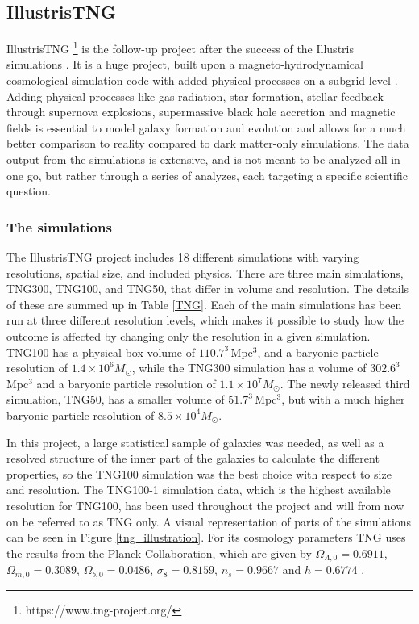 \subsection{IllustrisTNG}
IllustrisTNG \footnote{https://www.tng-project.org/} is the follow-up project after the success of the Illustris simulations \parencite{Springel2017, Pillepich2017,Naiman2018, Nelson2017, Marinacci2018}. It is a huge project, built upon a magneto-hydrodynamical cosmological simulation code with added physical processes on a subgrid level \parencite{Weinberger2016}. Adding physical processes like gas radiation, star formation, stellar feedback through supernova explosions, supermassive black hole accretion and magnetic fields is essential to model galaxy formation and evolution and allows for a much better comparison to reality compared to dark matter-only simulations. The data output from the simulations is extensive, and is not meant to be analyzed all in one go, but rather through a series of analyzes, each targeting a specific scientific question. 


\subsubsection{The simulations}
The IllustrisTNG project includes 18 different simulations with varying resolutions, spatial size, and included physics. There are three main simulations, TNG300, TNG100, and TNG50, that differ in volume and resolution. The details of these are summed up in Table \ref{TNG}. Each of the main simulations has been run at three different resolution levels, which makes it possible to study how the outcome is affected by changing only the resolution in a given simulation. TNG100 has a physical box volume of $110.7^3 \, $Mpc$^3$, and a baryonic particle resolution of $1.4 \times 10^6 M_{\odot}$, while the TNG300 simulation has a volume of $302.6^3 \, $Mpc$^3$ and a baryonic particle resolution of $1.1 \times 10^7 M_{\odot}$. The newly released third simulation, TNG50, has a smaller volume of $51.7^3 \, $Mpc$^3$, but with a much higher baryonic particle resolution of $8.5 \times 10^4 M_{\odot}$. 

In this project, a large statistical sample of galaxies was needed, as well as a resolved structure of the inner part of the galaxies to calculate the different properties, so the TNG100 simulation was the best choice with respect to size and resolution. The TNG100-1 simulation data, which is the highest available resolution for TNG100, has been used throughout the project and will from now on be referred to as TNG only. A visual representation of parts of the simulations can be seen in Figure \ref{tng_illustration}. For its cosmology parameters TNG uses the results from the Planck Collaboration, which are given by $\Omega_{\Lambda,0} = 0.6911$, $\Omega_{m,0}=0.3089$, $\Omega_{b,0}=0.0486$, $\sigma_8=0.8159$, $n_s=0.9667$ and $h = 0.6774$ \parencite{Planck2016}.

